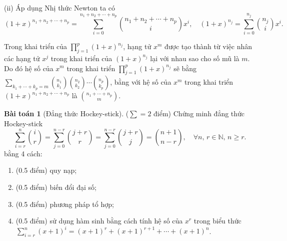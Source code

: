 \documentclass[a4paper, 11pt]{article}
\theoremstyle{definition}
\newtheorem{baitoan}{Bài toán}
\begin{document}
\begin{enumerate}[label=(\alph*)]
		(ii) Áp dụng Nhị thức Newton ta có
		$$(1+x)^{n_1+n_2+\cdots+n_p} = \sum\limits_{i=0}^{n_1+n_2+\cdots+n_p} {n_1+n_2+\cdots+n_p \choose i}x^i,\quad (1+x)^{n_j} = \sum\limits_{i=0}^{n_j} {n_j \choose i}x^i.$$

		Trong khai triển của $\displaystyle \prod\limits_{j=1}^p (1+x)^{n_j}$, hạng tử $x^m$ được tạo thành từ việc nhân các hạng tử $x^j$ trong khai triển của $(1+x)^{n_j}$ lại với nhau sao cho số mũ là $m$. Do đó hệ số của $x^m$ trong khai triển $\displaystyle \prod\limits_{j=1}^p (1+x)^{n_j}$ sẽ bằng $\displaystyle\sum\limits_{k_1+\cdots+k_p = m} {n_1\choose k_1}{n_2\choose k_2}\cdots{n_p\choose k_p}$, bằng với hệ số của $x^m$ trong khai triển $(1+x)^{n_1+n_2+\cdots+n_p}$ là $\displaystyle {n_1 + \cdots + n_p \choose m}$.
	\end{enumerate}

	\begin{tcolorbox}[breakable]
    	\begin{baitoan}[Đẳng thức Hockey-stick]
			($\sum = 2$ điểm) Chứng minh đẳng thức Hockey-stick 
			$$\sum\limits_{i=r}^n {i \choose r} = \sum\limits_{j=0}^{n-r} {j+r \choose r} = \sum\limits_{j=0}^{n-r} {j+r \choose j} = {n+1 \choose n-r},\quad\forall n,\,r\in \mathbb{N},\,n\ge r.$$
			bằng 4 cách: 
			\begin{enumerate}[label=(\alph*)]
				\item (0.5 điểm) quy nạp;
				\item (0.5 điểm) biến đổi đại số;
				\item (0.5 điểm) phương pháp tổ hợp;
				\item (0.5 điểm) sử dụng hàm sinh bằng cách tính hệ số của $x^r$ trong biểu thức $\displaystyle \sum\limits_{i=r}^n (x+1)^i = (x+1)^r+(x+1)^{r+1}+\cdots+(x+1)^n$.
			\end{enumerate}
		\end{baitoan}
	\end{tcolorbox}
\end{document}
